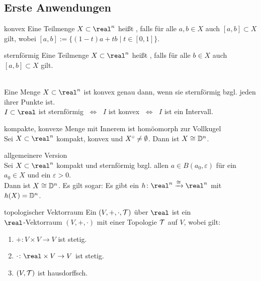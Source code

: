 \pagebreak

\subsection{%
    Erste Anwendungen%
}

\begin{Def}{konvex}
    Eine Teilmenge $X \subset \real^n$ heißt , falls
    für alle $a, b \in X$ auch $[a, b] \subset X$ gilt, wobei
    $[a, b] := \{(1 - t)a + tb \;|\; t \in [0, 1]\}$.
\end{Def}

\begin{Def}{sternförmig}
    Eine Teilmenge $X \subset \real^n$ heißt
    ,
    falls für alle $b \in X$ auch $[a, b] \subset X$ gilt.
\end{Def}

\begin{Bem}\\
    Eine Menge $X \subset \real^n$ ist konvex genau dann, wenn sie sternförmig
    bzgl. jeden ihrer Punkte ist. \\
    $I \subset \real$ ist sternförmig $\;\Leftrightarrow\;$
    $I$ ist konvex $\;\Leftrightarrow\;$
    $I$ ist ein Intervall.
\end{Bem}

\begin{Satz}{kompakte, konvexe Menge mit Innerem
             ist homöomorph zur Vollkugel}\\
    Sei $X \subset \real^n$ kompakt, konvex und ${X}^\circ \not= \emptyset$.
    Dann ist $X \cong \mathbb{D}^n$.
\end{Satz}

\begin{Satz}{allgemeinere Version}\\
    Sei $X \subset \real^n$ kompakt und sternförmig bzgl. allen
    $a \in B(a_0, \varepsilon)$ für ein $a_0 \in X$ und ein
    $\varepsilon > 0$. \\
    Dann ist $X \cong \mathbb{D}^n$.
    Es gilt sogar:
    Es gibt ein $h\colon \real^n \homoe \real^n$ mit $h(X) = \mathbb{D}^n$.
\end{Satz}

\linie

\begin{Def}{topologischer Vektorraum}
    Ein  $(V, +, \cdot, \mathcal{T})$ über $\real$ ist
    ein \\
    $\real$-Vektorraum $(V, +, \cdot)$ mit einer Topologie $\mathcal{T}$ auf $V$,
    wobei gilt:
    \begin{enumerate}
        \item
        $+\colon V \times V \rightarrow V$ ist stetig.

        \item
        $\cdot\colon \real \times V \rightarrow V$ ist stetig.

        \item
        $(V, \mathcal{T})$ ist hausdorffsch.
    \end{enumerate}
\end{Def}

